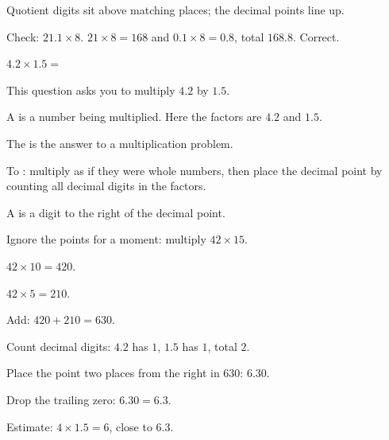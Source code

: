 \begin{center}
Quotient digits sit above matching places; the decimal points line up.
\end{center}


\noindent Check: $21.1 \times 8$. $21 \times 8 = 168$ and $0.1 \times 8 = 0.8$,
total $168.8$. Correct.


\noindent $4.2 \times 1.5 = $\ansblank{}


\noindent This question asks you to multiply $4.2$ by $1.5$.

\begin{words}
  \item A is a number being multiplied. Here the factors are $4.2$
        and $1.5$.
  \item The is the answer to a multiplication problem.
  \item To \unskip: multiply as if they were whole
        numbers, then place the decimal point by counting all decimal digits in
        the factors.
  \item A is a digit to the right of the decimal point.
\end{words}

\begin{steps}
  \item Ignore the points for a moment: multiply $42 \times 15$.
  \item $42 \times 10 = 420$.
  \item $42 \times 5 = 210$.
  \item Add: $420 + 210 = 630$.
  \item Count decimal digits: $4.2$ has $1$, $1.5$ has $1$, total $2$.
  \item Place the point two places from the right in $630$: $6.30$.
  \item Drop the trailing zero: $6.30 = 6.3$.
\end{steps}


\noindent Estimate: $4 \times 1.5 = 6$, close to $6.3$.

